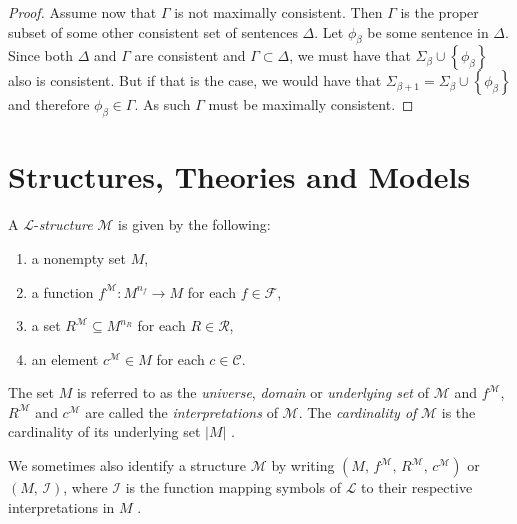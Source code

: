 \documentclass[../../main.tex]{subfiles}
\begin{document}
\begin{proof}
    Assume now that $\Gamma$ is not maximally consistent.
    Then $\Gamma$ is the proper subset of some other consistent set of sentences $\Delta$.
    Let $\phi_{\beta}$ be some sentence in $\Delta$.
    Since both $\Delta$ and $\Gamma$ are consistent and $\Gamma \subset \Delta$, 
    we must have that $\Sigma_{\beta} \cup \left\{\phi_{\beta}\right\}$ also is consistent.
    But if that is the case, we would have that $\Sigma_{\beta + 1} = \Sigma_{\beta} \cup \left\{\phi_{\beta}\right\}$ and therefore $\phi_{\beta} \in \Gamma$.
    As such $\Gamma$ must be maximally consistent.
\end{proof}

\section{Structures, Theories and Models}
\begin{definition}\label{structure-def}
    A $\mathcal{L}$-\textit{structure} $\mathcal{M}$ is given by the following:
    \begin{enumerate}
        \item a nonempty set $M$,
        \item a function $f^{\mathcal{M}}: M^{n_f} \to M$ for each $f \in \mathcal{F}$,
        \item a set $R^\mathcal{M} \subseteq M^{n_R}$ for each $R \in \mathcal{R}$,
        \item an element $c^\mathcal{M} \in M$ for each $c \in \mathcal{C}$.
    \end{enumerate}
    The set $M$ is referred to as the \textit{universe}, \textit{domain} or \textit{underlying set} of $\mathcal{M}$ 
    and $f^{\mathcal{M}}$, $R^{\mathcal{M}}$ and $c^{\mathcal{M}}$ are called the \textit{interpretations} of $\mathcal{M}$. 
    The \textit{cardinality of} $\mathcal{M}$ is the cardinality of its underlying set $\left\lvert M\right\rvert$ \cite[Definition 1.1.2]{Mar02}.

    We sometimes also identify a structure $\mathcal{M}$ by writing $\left(M,\, f^{\mathcal{M}},\, R^{\mathcal{M}},\, c^{\mathcal{M}}\right)$ \cite{Mar02} or $\left(M,\, \mathcal{I}\right)$, 
    where $\mathcal{I}$ is the function mapping symbols of $\mathcal{L}$ to their respective interpretations in $M$ \cite[p.20]{Cha90}.
\end{definition}
\end{document}

